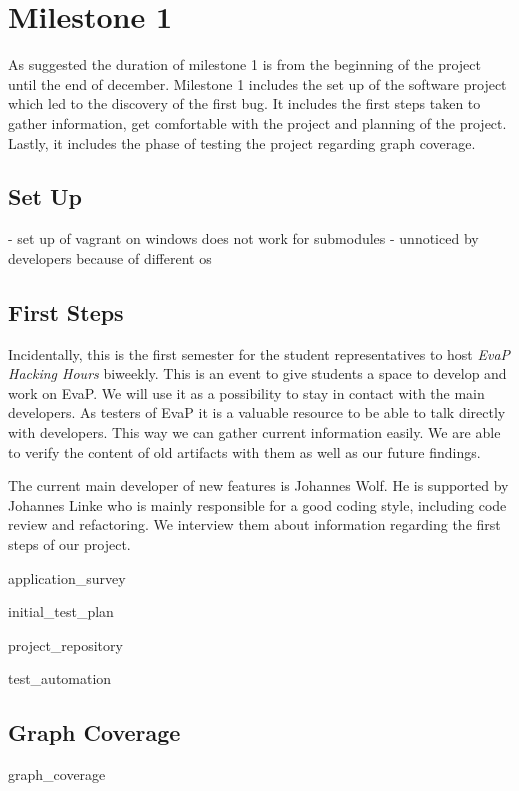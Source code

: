 \section{Milestone 1}
As suggested the duration of milestone 1 is from the beginning of the project until the end of december.
Milestone 1 includes the set up of the software project which led to the discovery of the first bug.
It includes the first steps taken to gather information, get comfortable with the project and planning of the project.
Lastly, it includes the phase of testing the project regarding graph coverage.

\subsection{Set Up}
- set up of vagrant on windows does not work for submodules
- unnoticed by developers because of different os


\subsection{First Steps}
Incidentally, this is the first semester for the student representatives to host \emph{EvaP Hacking Hours} biweekly.
This is an event to give students a space to develop and work on EvaP.
We will use it as a possibility to stay in contact with the main developers.
As testers of EvaP it is a valuable resource to be able to talk directly with developers.
This way we can gather current information easily.
We are able to verify the content of old artifacts with them as well as our future findings.

The current main developer of new features is Johannes Wolf. 
He is supported by Johannes Linke who is mainly responsible for a good coding style, including code review and refactoring. 
We interview them about information regarding the first steps of our project.

{application_survey}

{initial_test_plan}

{project_repository}

{test_automation}

\subsection{Graph Coverage}

{graph_coverage}
